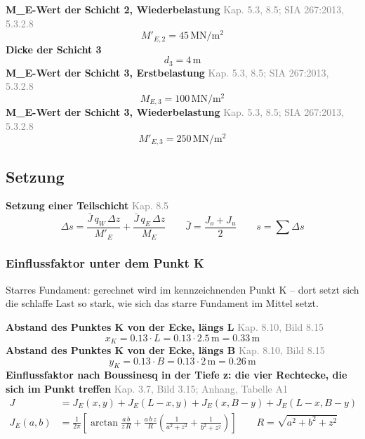 \documentclass[11pt,a4paper]{article}
\newcommand{\normref}[1]{{\small\textcolor{gray}{#1}}}
\begin{document}
\noindent\textbf{M\_E-Wert der Schicht 2, Wiederbelastung} \hfill \normref{Kap. 5.3, 8.5; SIA 267:2013, 5.3.2.8}
\begin{equation*}
M'_{E,2} = 45\,\mathrm{MN}/\mathrm{m}^{2}
\end{equation*}
\noindent\textbf{Dicke der Schicht 3}
\begin{equation*}
d_{3} = 4\,\mathrm{m}
\end{equation*}
\noindent\textbf{M\_E-Wert der Schicht 3, Erstbelastung} \hfill \normref{Kap. 5.3, 8.5; SIA 267:2013, 5.3.2.8}
\begin{equation*}
M_{E,3} = 100\,\mathrm{MN}/\mathrm{m}^{2}
\end{equation*}
\noindent\textbf{M\_E-Wert der Schicht 3, Wiederbelastung} \hfill \normref{Kap. 5.3, 8.5; SIA 267:2013, 5.3.2.8}
\begin{equation*}
M'_{E,3} = 250\,\mathrm{MN}/\mathrm{m}^{2}
\end{equation*}
\subsection{Setzung}
\noindent\textbf{Setzung einer Teilschicht} \hfill \normref{Kap. 8.5}
\begin{equation*}
\Delta s = \frac{\bar{J} \, q_W \, \Delta z}{M'_E} + \frac{\bar{J} \, q_E \, \Delta z}{M_E} \qquad \bar{J} = \frac{J_o + J_u}{2} \qquad s = \sum \Delta s
\end{equation*}
\subsubsection{Einflussfaktor unter dem Punkt K}
Starres Fundament: gerechnet wird im kennzeichnenden Punkt K – dort setzt sich die schlaffe Last so stark, wie sich das starre Fundament im Mittel setzt.

\noindent\textbf{Abstand des Punktes K von der Ecke, längs L} \hfill \normref{Kap. 8.10, Bild 8.15}
\begin{equation*}
x_K = 0.13 \cdot L = 0.13 \cdot 2.5\,\mathrm{m} = 0.33\,\mathrm{m}
\end{equation*}
\noindent\textbf{Abstand des Punktes K von der Ecke, längs B} \hfill \normref{Kap. 8.10, Bild 8.15}
\begin{equation*}
y_K = 0.13 \cdot B = 0.13 \cdot 2\,\mathrm{m} = 0.26\,\mathrm{m}
\end{equation*}
\noindent\textbf{Einflussfaktor nach Boussinesq in der Tiefe z: die vier Rechtecke, die sich im Punkt treffen} \hfill \normref{Kap. 3.7, Bild 3.15; Anhang, Tabelle A1}
\begin{equation*}
\begin{aligned} J &= J_E(x, y) + J_E(L - x, y) + J_E(x, B - y) + J_E(L - x, B - y) \\ J_E(a, b) &= \frac{1}{2\pi} \left[\arctan\frac{a \, b}{z \, R} + \frac{a \, b \, z}{R} \left(\frac{1}{a^2 + z^2} + \frac{1}{b^2 + z^2}\right)\right] \qquad R = \sqrt{a^2 + b^2 + z^2} \end{aligned}
\end{equation*}
\end{document}
